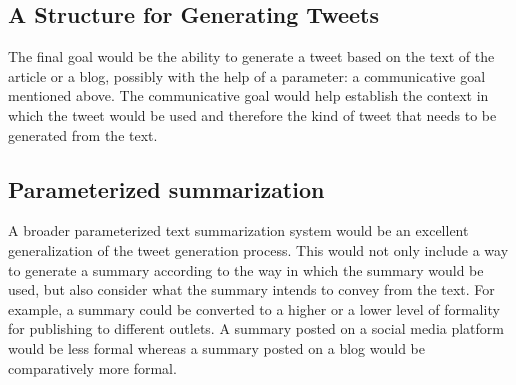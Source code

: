 \subsection{A Structure for Generating Tweets}
The final goal would be the ability to generate a tweet based on the text of the article or a blog, possibly with the help of a parameter: a communicative goal mentioned above. The communicative goal would help establish the context in which the tweet would be used and therefore the kind of tweet that needs to be generated from the text.  

\subsection{Parameterized summarization}
A broader parameterized text summarization system would be an excellent generalization of the tweet generation process. This would not only include a way to generate a summary according to the way in which the summary would be used, but also consider what the summary intends to convey from the text. For example, a summary could be converted to a higher or a lower level of formality for publishing to different outlets. A summary posted on a social media platform would be less formal whereas a summary posted on a blog would be comparatively more formal.
